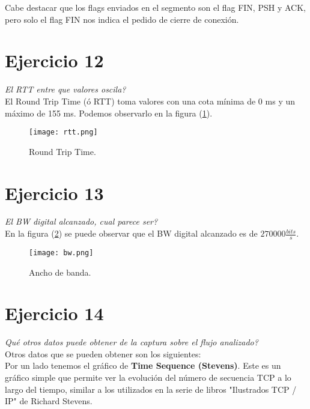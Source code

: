 \documentclass[osajnl,twocolumn,showpacs,superscriptaddress,10pt]{revtex4-1} %
\begin{document}
Cabe destacar que los flags enviados en el segmento son el flag FIN, PSH y ACK, pero solo el flag FIN nos indica el pedido de cierre de conexión. \\

\newpage

\section{Ejercicio 12}

\textit{El RTT entre que valores oscila?} \\

El Round Trip Time (ó RTT) toma valores con una cota mínima de 0 ms y un máximo de 155 ms. Podemos observarlo en la figura (\ref{rtt}). \\

\begin{figure}[H]
    \centering
    \texttt{[image: rtt.png]}
    \caption{Round Trip Time.}
    \label{rtt}
\end{figure}

\section{Ejercicio 13}

\textit{El BW digital alcanzado, cual parece ser?} \\

En la figura (\ref{bw}) se puede observar que el BW digital alcanzado es de $270000 \frac{bits}{s}$.

\begin{figure}[H]
    \centering
    \texttt{[image: bw.png]}
    \caption{Ancho de banda.}
    \label{bw}
\end{figure}

\newpage

\section{Ejercicio 14}

\textit{Qué otros datos puede obtener de la captura sobre el flujo analizado?} \\

Otros datos que se pueden obtener son los siguientes: \\

Por un lado tenemos el gráfico de \textbf{Time Sequence (Stevens)}. Este es un gráfico 
simple que permite ver la evolución del número de secuencia TCP a lo largo del tiempo, 
similar a los utilizados en la serie de libros "Ilustrados TCP / IP" de Richard Stevens. \\
\end{document}
